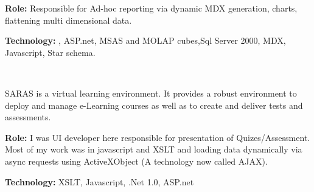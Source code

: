 \begin{resume}
\begin{position}
{\textbf{Role:}} Responsible for Ad-hoc reporting via dynamic MDX generation, charts, flattening multi dimensional data.

{\textbf{Technology:}} \CSharp, ASP.net, MSAS and MOLAP cubes,Sql Server 2000, MDX, Javascript, Star schema.
\end{position}\\

\begin{position}
SARAS is a virtual learning environment. It provides a robust environment to deploy and manage e-Learning courses as well as to create and deliver tests and assessments.

{\textbf{Role:}} I was UI developer here responsible for presentation of Quizes/Assessment. Most of my work was in javascript and XSLT and loading data dynamically via async requests using ActiveXObject (A technology now called AJAX).

{\textbf{Technology:}} XSLT, Javascript, .Net 1.0, ASP.net
\end{position}\\




\end{resume}

